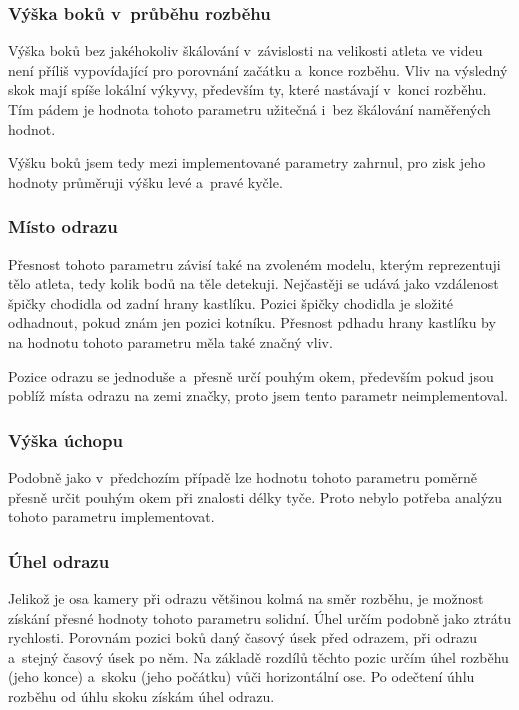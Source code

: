 \subsubsection{Výška boků v~průběhu rozběhu}

Výška boků bez jakéhokoliv škálování v~závislosti na velikosti atleta ve videu není příliš vypovídající pro porovnání začátku a~konce rozběhu. Vliv na výsledný skok mají spíše lokální výkyvy, především ty, které nastávají v~konci rozběhu. Tím pádem je hodnota tohoto parametru užitečná i~bez škálování naměřených hodnot.

Výšku boků jsem tedy mezi implementované parametry zahrnul, pro zisk jeho hodnoty průměruji výšku levé a~pravé kyčle.


\subsubsection{Místo odrazu}

Přesnost tohoto parametru závisí také na zvoleném modelu, kterým reprezentuji tělo atleta, tedy kolik bodů na těle detekuji. Nejčastěji se udává jako vzdálenost špičky chodidla od zadní hrany kastlíku. Pozici špičky chodidla je složité odhadnout, pokud znám jen pozici kotníku. Přesnost pdhadu hrany kastlíku by na hodnotu tohoto parametru měla také značný vliv.

Pozice odrazu se jednoduše a~přesně určí pouhým okem, především pokud jsou poblíž místa odrazu na zemi značky, proto jsem tento parametr neimplementoval.


\subsubsection{Výška úchopu}

Podobně jako v~předchozím případě lze hodnotu tohoto parametru poměrně přesně určit pouhým okem při znalosti délky tyče. Proto nebylo potřeba analýzu tohoto parametru implementovat.


\subsubsection{Úhel odrazu}

Jelikož je osa kamery při odrazu většinou kolmá na směr rozběhu, je možnost získání přesné hodnoty tohoto parametru solidní. Úhel určím podobně jako ztrátu rychlosti. Porovnám pozici boků daný časový úsek před odrazem, při odrazu a~stejný časový úsek po něm. Na základě rozdílů těchto pozic určím úhel rozběhu (jeho konce) a~skoku (jeho počátku) vůči horizontální ose. Po odečtení úhlu rozběhu od úhlu skoku získám úhel odrazu.

